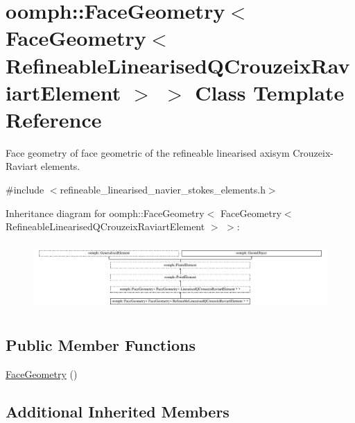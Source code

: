 \hypertarget{classoomph_1_1FaceGeometry_3_01FaceGeometry_3_01RefineableLinearisedQCrouzeixRaviartElement_01_4_01_4}{}\section{oomph\+:\+:Face\+Geometry$<$ Face\+Geometry$<$ Refineable\+Linearised\+Q\+Crouzeix\+Raviart\+Element $>$ $>$ Class Template Reference}
\label{classoomph_1_1FaceGeometry_3_01FaceGeometry_3_01RefineableLinearisedQCrouzeixRaviartElement_01_4_01_4}


Face geometry of face geometric of the refineable linearised axisym Crouzeix-\/\+Raviart elements.  




{\ttfamily \#include $<$refineable\+\_\+linearised\+\_\+navier\+\_\+stokes\+\_\+elements.\+h$>$}

Inheritance diagram for oomph\+:\+:Face\+Geometry$<$ Face\+Geometry$<$ Refineable\+Linearised\+Q\+Crouzeix\+Raviart\+Element $>$ $>$\+:\begin{figure}[H]
\begin{center}
\leavevmode
\includegraphics[height=2.592592cm]{classoomph_1_1FaceGeometry_3_01FaceGeometry_3_01RefineableLinearisedQCrouzeixRaviartElement_01_4_01_4}
\end{center}
\end{figure}
\subsection*{Public Member Functions}
\begin{DoxyCompactItemize}
\item 
\hyperlink{classoomph_1_1FaceGeometry_3_01FaceGeometry_3_01RefineableLinearisedQCrouzeixRaviartElement_01_4_01_4_a6b2393a22f7935b2b92bb8d3ab3c2c5c}{Face\+Geometry} ()
\end{DoxyCompactItemize}
\subsection*{Additional Inherited Members}


